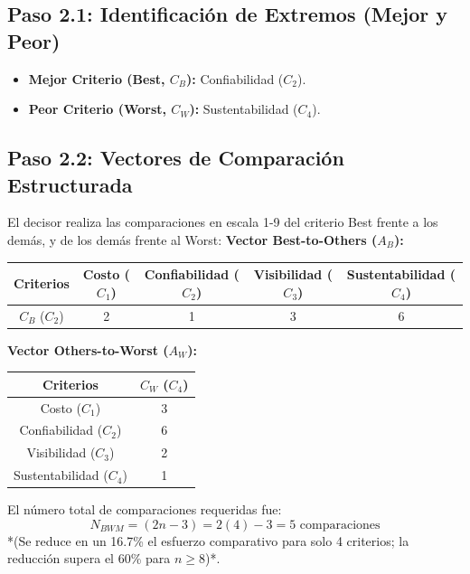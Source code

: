 \documentclass[11pt, letterpaper]{article}
\begin{document}
\subsection{Paso 2.1: Identificación de Extremos (Mejor y Peor)}
\begin{itemize}
    \item \textbf{Mejor Criterio (Best, $C_B$):} Confiabilidad ($C_2$).
    \item \textbf{Peor Criterio (Worst, $C_W$):} Sustentabilidad ($C_4$).
\end{itemize}

\subsection{Paso 2.2: Vectores de Comparación Estructurada}
El decisor realiza las comparaciones en escala 1-9 del criterio Best frente a los demás, y de los demás frente al Worst:
\noindent \textbf{Vector Best-to-Others ($A_B$):}
    \begin{table}[h]
        \centering
        \begin{tabular}{ccccc}
            \toprule
            Criterios & Costo ($C_1$) & Confiabilidad ($C_2$) & Visibilidad ($C_3$) & Sustentabilidad ($C_4$) \\
            \midrule
            $C_B$ ($C_2$) & 2 & 1 & 3 & 6 \\
            \bottomrule
        \end{tabular}
    \end{table}
\noindent \textbf{Vector Others-to-Worst ($A_W$):}
    \begin{table}[h]
        \centering
        \begin{tabular}{cc}
            \toprule
            Criterios & $C_W$ ($C_4$) \\
            \midrule
            Costo ($C_1$) & 3 \\
            Confiabilidad ($C_2$) & 6 \\
            Visibilidad ($C_3$) & 2 \\
            Sustentabilidad ($C_4$) & 1 \\
            \bottomrule
        \end{tabular}
    \end{table}

El número total de comparaciones requeridas fue:
\begin{equation}
    N_{BWM} = (2n - 3) = 2(4) - 3 = 5 \text{ comparaciones}
\end{equation}
*(Se reduce en un 16.7\% el esfuerzo comparativo para solo 4 criterios; la reducción supera el 60\% para $n \ge 8$)*.
\end{document}
